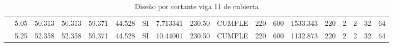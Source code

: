 \begin{table}[H]
{\begin{tabular}{|c|c|c|c|c|c|c|c|c|c|c|c|c|c|c|c|c|c|}
\cline{2-18}          & 5.05  & 50.313 & 50.313 & 59.371 & 44.528 & SI    & 7.713341 & 230.50 & CUMPLE & 220   & 600   & 1533.343 & 220   & 2     & 2     & 32    & 64 \bigstrut\\
\cline{2-18}          & 5.25  & 52.358 & 52.358 & 59.371 & 44.528 & SI    & 10.44001 & 230.50 & CUMPLE & 220   & 600   & 1132.873 & 220   & 2     & 2     & 32    & 64 \bigstrut\\
    \hline
    \end{tabular}}%
  \caption{Diseño por cortante viga 11 de cubierta}
  \label{tab:Cort V10C}%
\end{table}%
